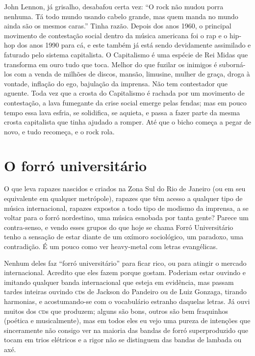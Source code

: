 John Lennon, já grisalho, desabafou certa vez: “O rock não mudou porra
nenhuma. Tá todo mundo usando cabelo grande, mas quem manda no mundo
ainda são os mesmos caras.” Tinha razão. Depois dos anos 1960, o
principal movimento de contestação social dentro da música americana
foi o rap e o hip-hop dos anos 1990 para cá, e este também já está
sendo devidamente assimilado e faturado pelo sistema capitalista. O
Capitalismo é uma espécie de Rei Midas que transforma em ouro tudo
que toca. Melhor do que fuzilar os inimigos é suborná-los com a venda
de milhões de discos, mansão, limusine, mulher de graça, droga à
vontade, inflação do ego, bajulação da imprensa. Não tem contestador
que aguente. Toda vez que a crosta do Capitalismo é rachada por um
movimento de contestação, a lava fumegante da crise social emerge
pelas fendas; mas em pouco tempo essa lava esfria, se solidifica, se
aquieta, e passa a fazer parte da mesma crosta capitalista que tinha
ajudado a romper. Até que o bicho começa a pegar de novo, e tudo
recomeça, e o rock rola.

\chapter{O forró universitário}

O que leva rapazes nascidos e criados na Zona Sul do Rio de Janeiro
(ou em seu equivalente em qualquer metrópole), rapazes que têm acesso
a qualquer tipo de música internacional, rapazes expostos a todo tipo
de modismo da imprensa, a se voltar para o forró nordestino, uma
música esnobada por tanta gente? Parece um contra-senso, e vendo
esses grupos do que hoje se chama Forró Universitário tenho a
sensação de estar diante de um oxímoro sociológico, um paradoxo, uma
contradição. É um pouco como ver heavy-metal com letras evangélicas.

Nenhum deles faz “forró universitário” para ficar rico, ou para
atingir o mercado internacional. Acredito que eles fazem porque
gostam. Poderiam estar ouvindo e imitando qualquer banda
internacional que esteja em evidência, mas passam tardes inteiras
ouvindo \textsc{cd}s de Jackson do Pandeiro ou de Luiz Gonzaga, tirando
harmonias, e acostumando-se com o vocabulário estranho daquelas
letras. Já ouvi muitos dos \textsc{cd}s que produzem; alguns são bons, outros
são bem fraquinhos (poética e musicalmente), mas em todos eles eu
vejo uma pureza de intenções que sinceramente não consigo ver na
maioria das bandas de forró superproduzido que tocam em trios
elétricos e a rigor não se distinguem das bandas de lambada ou axé.

